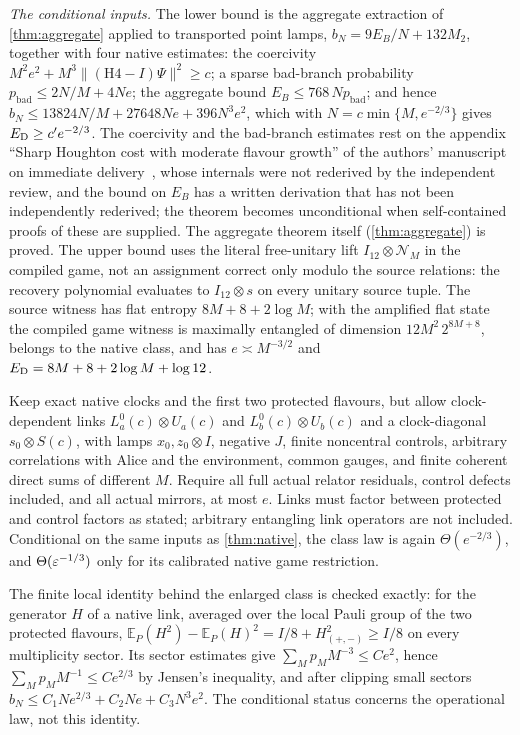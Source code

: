 \emph{The conditional inputs.} The lower bound is the aggregate extraction of \cref{thm:aggregate} applied to transported point
lamps, $b_N=9E_B/N+132M_2$, together with four native estimates: the coercivity $M^2e^2+M^3\|(\mathrm{H4}-I)\Psi\|^2\ge c$; a sparse
bad-branch probability $p_{\mathrm{bad}}\le2N/M+4Ne$; the aggregate bound $E_B\le768\,Np_{\mathrm{bad}}$; and hence
$b_N\le13824N/M+27648Ne+396N^3e^2$, which with $N=c\min\{M,e^{-2/3}\}$ gives $E_{\mathrm D}\ge c'e^{-2/3}$. The coercivity and the bad-branch
estimates rest on the appendix ``Sharp Houghton cost with moderate flavour growth'' of the authors' manuscript on
immediate delivery~\cite{DM-ID}, whose internals were not rederived by the independent review, and the bound on $E_B$ has a written derivation that has not been independently
rederived; the theorem becomes unconditional when self-contained proofs of these are supplied. The aggregate theorem itself
(\cref{thm:aggregate}) is proved. The upper bound uses the literal free-unitary lift $I_{12}\otimes\mathcal N_M$ in the compiled game,
not an assignment correct only modulo the source relations: the recovery polynomial evaluates to $I_{12}\otimes s$ on every
unitary source tuple. The source witness has flat entropy $8M+8+2\log M$; with the amplified flat state the compiled game
witness is maximally entangled of dimension $12M^2\,2^{8M+8}$, belongs to the native class, and has $e\asymp M^{-3/2}$ and
$E_{\mathrm D}=8M+8+2\log M+\log12$.

\begin{theorem}\label{thm:native-enlarged}
Keep exact native clocks and the first two protected flavours, but allow clock-dependent links $L^0_a(c)\otimes U_a(c)$ and
$L^0_b(c)\otimes U_b(c)$ and a clock-diagonal $s_0\otimes S(c)$, with lamps $x_0,z_0\otimes I$, negative $J$, finite noncentral
controls, arbitrary correlations with Alice and the environment, common gauges, and finite coherent direct sums of different
$M$. Require all full actual relator residuals, control defects included, and all actual mirrors, at most $e$. Links must factor
between protected and control factors as stated; arbitrary entangling link operators are not included. Conditional on the same
inputs as \cref{thm:native}, the class law is again $\Theta(e^{-2/3})$, and $\Theta(\varepsilon^{-1/3})$ only for its calibrated
native game restriction.
\end{theorem}

The finite local identity behind the enlarged class is checked exactly: for the generator $H$ of a native link, averaged over the
local Pauli group of the two protected flavours, $\mathbb E_P(H^2)-\mathbb E_P(H)^2=I/8+H_{(+,-)}^2\ge I/8$ on every multiplicity
sector. Its sector estimates give $\sum_Mp_MM^{-3}\le Ce^2$, hence $\sum_Mp_MM^{-1}\le Ce^{2/3}$ by Jensen's inequality, and after
clipping small sectors $b_N\le C_1Ne^{2/3}+C_2Ne+C_3N^3e^2$. The conditional status concerns the operational law, not this
identity.
